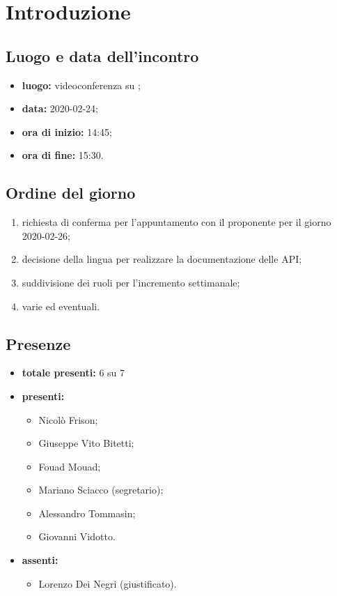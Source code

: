 \section*{Introduzione}

\subsection*{Luogo e data dell'incontro}
	\begin{itemize}
		\item \textbf{luogo:} videoconferenza su ;
		\item \textbf{data:} 2020-02-24;
		\item \textbf{ora di inizio:} 14:45;
		\item \textbf{ora di fine:} 15:30.
	\end{itemize}

\subsection*{Ordine del giorno}
	\begin{enumerate}
			\item richiesta di conferma per l'appuntamento con il proponente per il giorno 2020-02-26;
			\item decisione della lingua per realizzare la documentazione delle API;
			\item suddivisione dei ruoli per l'incremento settimanale;
  			\item varie ed eventuali.
	\end{enumerate}

\subsection*{Presenze}
	\begin{itemize}
		\item \textbf{totale presenti:} 6 su 7
		\item \textbf{presenti: }
			\begin{itemize}
				\item Nicolò Frison;
				\item Giuseppe Vito Bitetti;
				\item Fouad Mouad;
				\item Mariano Sciacco (segretario);
				\item Alessandro Tommasin;
				\item Giovanni Vidotto.
			\end{itemize}
		\item \textbf{assenti: }
			\begin{itemize}
				\item Lorenzo Dei Negri (giustificato).
			\end{itemize}
	\end{itemize}


